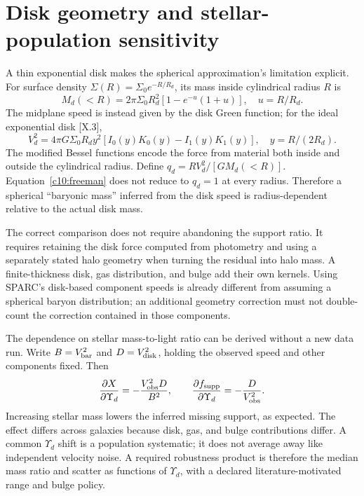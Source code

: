 \section{Disk geometry and stellar-population sensitivity}

A thin exponential disk makes the spherical approximation's limitation explicit. For surface density $\Sigma(R)=\Sigma_0e^{-R/R_d}$, its mass inside cylindrical radius $R$ is
\begin{equation}
 M_d(<R)=2\pi\Sigma_0R_d^2[1-e^{-u}(1+u)],\quad u=R/R_d.
 \label{c10:diskmass}
\end{equation}
The midplane speed is instead given by the disk Green function; for the ideal exponential disk [X.3],
\begin{equation}
 V_d^2=4\pi G\Sigma_0R_d y^2
 [I_0(y)K_0(y)-I_1(y)K_1(y)],\quad y=R/(2R_d).
 \label{c10:freeman}
\end{equation}
The modified Bessel functions encode the force from material both inside and outside the cylindrical radius. Define $q_d=RV_d^2/[GM_d(<R)]$. Equation~\eqref{c10:freeman} does not reduce to $q_d=1$ at every radius. Therefore a spherical ``baryonic mass'' inferred from the disk speed is radius-dependent relative to the actual disk mass.

The correct comparison does not require abandoning the support ratio. It requires retaining the disk force computed from photometry and using a separately stated halo geometry when turning the residual into halo mass. A finite-thickness disk, gas distribution, and bulge add their own kernels. Using SPARC's disk-based component speeds is already different from assuming a spherical baryon distribution; an additional geometry correction must not double-count the correction contained in those components.

The dependence on stellar mass-to-light ratio can be derived without a new data run. Write $B=V_{\rm bar}^2$ and $D=V_{\rm disk}^2$, holding the observed speed and other components fixed. Then
\begin{equation}
 \frac{\partial X}{\partial\Upsilon_d}
 =-\frac{V_{\rm obs}^2D}{B^2},\qquad
 \frac{\partial f_{\rm supp}}{\partial\Upsilon_d}
 =-\frac{D}{V_{\rm obs}^2}.
 \label{c10:upsderivative}
\end{equation}
Increasing stellar mass lowers the inferred missing support, as expected. The effect differs across galaxies because disk, gas, and bulge contributions differ. A common $\Upsilon_d$ shift is a population systematic; it does not average away like independent velocity noise. A required robustness product is therefore the median mass ratio and scatter as functions of $\Upsilon_d$, with a declared literature-motivated range and bulge policy.

